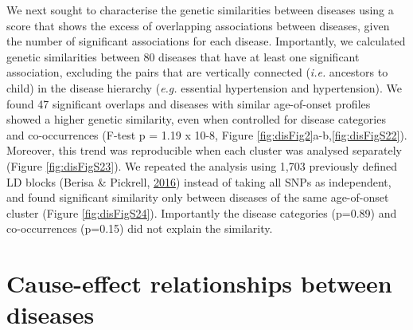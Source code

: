 \documentclass[12pt,twoside]{unicam}
\begin{document}
We next sought to characterise the genetic similarities between diseases using a score that shows the excess of overlapping associations between diseases, given the number of significant associations for each disease. Importantly, we calculated genetic similarities between 80 diseases that have at least one significant association, excluding the pairs that are vertically connected (\emph{i.e.} ancestors to child) in the disease hierarchy (\emph{e.g.} essential hypertension and hypertension). We found 47 significant overlaps and diseases with similar age-of-onset profiles showed a higher genetic similarity, even when controlled for disease categories and co-occurrences (F-test p = 1.19 x 10-8, Figure \ref{fig:disFig2}a-b,\ref{fig:disFigS22}). Moreover, this trend was reproducible when each cluster was analysed separately (Figure \ref{fig:disFigS23}). We repeated the analysis using 1,703 previously defined LD blocks (Berisa \& Pickrell, \protect\hyperlink{ref-Berisa2016}{2016}) instead of taking all SNPs as independent, and found significant similarity only between diseases of the same age-of-onset cluster (Figure \ref{fig:disFigS24}). Importantly the disease categories (p=0.89) and co-occurrences (p=0.15) did not explain the similarity.

\hypertarget{cause-effect-relationships-between-diseases}{%
\section{Cause-effect relationships between diseases}\label{cause-effect-relationships-between-diseases}}
\end{document}
